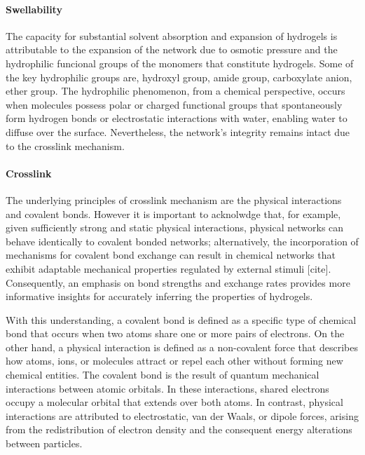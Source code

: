 \paragraph{Swellability} The capacity for substantial solvent absorption and expansion of hydrogels is attributable to the expansion of the network due to osmotic pressure and the hydrophilic funcional groups of the monomers that constitute hydrogels.
Some of the key hydrophilic groups are,
    hydroxyl group,
    amide group,
    carboxylate anion,
    ether group.
The hydrophilic phenomenon, from a chemical perspective, occurs when molecules possess polar or charged functional groups that spontaneously form hydrogen bonds or electrostatic interactions with water, enabling water to diffuse over the surface.
Nevertheless, the network's integrity remains intact due to the crosslink mechanism\citep{lelePredictionsBoundWater1997}.

\paragraph{Crosslink} The underlying principles of crosslink mechanism are the physical interactions and covalent bonds.
However it is important to acknolwdge that, for example, given sufficiently strong and static physical interactions, physical networks can behave identically to covalent bonded networks; 
alternatively, the incorporation of mechanisms for covalent bond exchange can result in chemical networks that exhibit adaptable mechanical properties regulated by external stimuli [cite]. 
Consequently, an emphasis on bond strengths and exchange rates provides more informative insights for accurately inferring the properties of hydrogels\citep{priyaComprehensiveReviewHydrogel2024}.

With this understanding, a covalent bond is defined as a specific type of chemical bond that occurs when two atoms share one or more pairs of electrons. 
On the other hand, a physical interaction is defined as a non-covalent force that describes how atoms, ions, or molecules attract or repel each other without forming new chemical entities. 
The covalent bond is the result of quantum mechanical interactions between atomic orbitals.
In these interactions, shared electrons occupy a molecular orbital that extends over both atoms. 
In contrast, physical interactions are attributed to electrostatic, van der Waals, or dipole forces, arising from the redistribution of electron density and the consequent energy alterations between particles.

